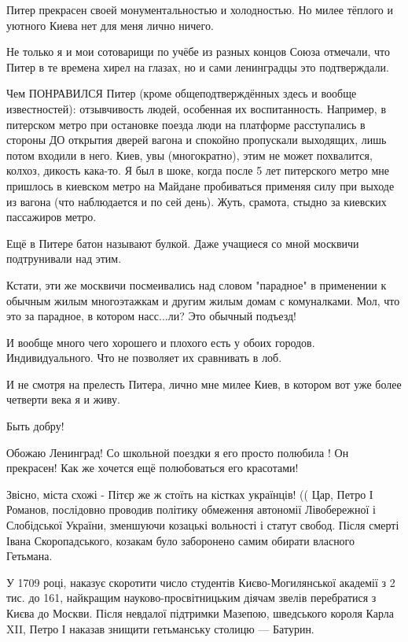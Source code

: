 \begin{itemize}
Питер прекрасен своей монументальностью и холодностью. Но милее тёплого и
уютного Киева нет для меня лично ничего.

Не только я и мои сотоварищи по учёбе из разных концов Союза отмечали, что
Питер в те времена хирел на глазах, но и сами ленинградцы это подтверждали.

Чем ПОНРАВИЛСЯ Питер (кроме общеподтверждённых здесь и вообще известностей):
отзывчивость людей, особенная их воспитанность. Например, в питерском метро при
остановке поезда люди на платформе расступались в стороны ДО открытия дверей
вагона и спокойно пропускали выходящих, лишь потом входили в него. Киев, увы
(многократно), этим не может похвалится, колхоз, дикость кака-то. Я был в шоке,
когда после 5 лет питерского метро мне пришлось в киевском метро на Майдане
пробиваться применяя силу при выходе из вагона (что наблюдается и по сей день).
Жуть, срамота, стыдно за киевских пассажиров метро.

Ещё в Питере батон называют булкой. Даже учащиеся со мной москвичи подтрунивали над этим.

Кстати, эти же москвичи посмеивались над словом "парадное" в применении к
обычным жилым многоэтажкам и другим жилым домам с комуналками. Мол, что это за
парадное, в котором насс...ли? Это обычный подъезд!

И вообще много чего хорошего и плохого есть у обоих городов. Индивидуального.
Что не позволяет их сравнивать в лоб.

И не смотря на прелесть Питера, лично мне милее Киев, в котором вот уже более
четверти века я и живу.

Быть добру!


Обожаю Ленинград!
Со школьной поездки я его просто полюбила !
Он прекрасен!
Как же хочется ещё полюбоваться его красотами!


Звісно, міста схожі - Пітєр же ж стоїть на кістках українців! (( Цар, Петро І
Романов, послідовно проводив політику обмеження автономії Лівобережної і
Слобідської України, зменшуючи козацькі вольності і статут свобод. Після смерті
Івана Скоропадського, козакам було заборонено самим обирати власного Гетьмана.

У 1709 році, наказує скоротити число студентів Києво-Могилянської академії з 2
тис. до 161, найкращим науково-просвітницьким діячам звелів перебратися з Києва
до Москви. Після невдалої підтримки Мазепою, шведського короля Карла XII, Петро
І наказав знищити гетьманську столицю — Батурин.


\end{itemize}
